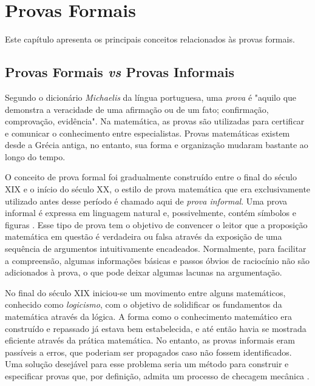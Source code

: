 
\chapter{Provas Formais}

Este capítulo apresenta os principais conceitos relacionados às provas formais.

\section{Provas Formais \textit{vs} Provas Informais}
\label{SEC:2.1-ProvasForInf}

Segundo o dicionário \textit{Michaelis} da língua portuguesa, uma \textit{prova} é "aquilo que demonstra a veracidade de uma afirmação ou de um fato; confirmação, comprovação, evidência". Na matemática, as provas são utilizadas para certificar e comunicar o conhecimento entre especialistas. Provas matemáticas existem desde a Grécia antiga, no entanto, sua forma e organização mudaram bastante ao longo do tempo.

O conceito de prova formal foi gradualmente construído entre o final do século XIX e o início do século XX, o estilo de prova matemática que era exclusivamente utilizado antes desse período é chamado aqui de \textit{prova informal}. Uma prova informal é expressa em linguagem natural e, possivelmente, contém símbolos e figuras \cite{HandBookPT}. Esse tipo de prova tem o objetivo de convencer o leitor que a proposição matemática em questão é verdadeira ou falsa através da exposição de uma sequência de argumentos intuitivamente encadeados. Normalmente, para facilitar a compreensão, algumas informações básicas e passos óbvios de raciocínio não são adicionados à prova, o que pode deixar algumas lacunas na argumentação.

No final do século XIX iniciou-se um movimento entre alguns matemáticos, conhecido como \textit{logicismo}, com o objetivo de solidificar os fundamentos da matemática através da lógica. A forma como o conhecimento matemático era construído e repassado já estava bem estabelecida, e até então havia se mostrada eficiente através da prática matemática. No entanto, as provas informais eram passíveis a erros, que poderiam ser propagados caso não fossem identificados. Uma solução desejável para esse problema seria um método para construir e especificar provas que, por definição, admita um processo de checagem mecânica \cite{marfori2010}.

